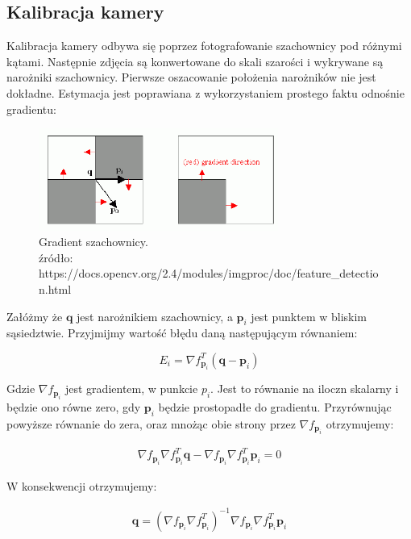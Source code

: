 \documentclass[oneside, eng]{mgr}
\newcommand{\bb}{\textbf}
\begin{document}
\subsection{Kalibracja kamery}

Kalibracja kamery odbywa się poprzez fotografowanie szachownicy pod różnymi kątami. Następnie zdjęcia są konwertowane do skali szarości i wykrywane są narożniki szachownicy. Pierwsze oszacowanie położenia narożników nie jest dokładne. Estymacja jest poprawiana z wykorzystaniem prostego faktu odnośnie gradientu:

\begin{figure}
\centering
	\includegraphics[width=0.70\textwidth]{cornersubpix.png}\par\vspace{1cm}
\caption{Gradient szachownicy. \\ źródło: https://docs.opencv.org/2.4/modules/imgproc/doc/feature\_detection.html}
	\label{fig:gradient}
\end{figure}

Załóżmy że $\bb{q}$ jest narożnikiem szachownicy, a $\bb{p}_i$ jest punktem w bliskim sąsiedztwie. Przyjmijmy wartość błędu daną następującym równaniem:

\begin{equation}
	E_i = \nabla f_{\bb{p}_i}^T (\bb{q} - \bb{p}_i)
\end{equation}

Gdzie $\nabla f_{\bb{p}_i}$ jest gradientem, w punkcie $p_i$. Jest to równanie na iloczn skalarny i będzie ono równe zero, gdy $\bb{p}_i$ będzie prostopadłe do gradientu. Przyrównując powyższe równanie do zera, oraz mnożąc obie strony przez $\nabla f_{\bb{p}_i}$ otrzymujemy:

\begin{align*}
	\nabla f_{\bb{p}_i} \nabla f_{\bb{p}_i}^T \bb{q} - \nabla f_{\bb{p}_i} \nabla f_{\bb{p}_i}^T \bb{p}_i = 0
\end{align*}

W konsekwencji otrzymujemy:

\begin{align}
	\bb{q} = (\nabla f_{\bb{p}_i} \nabla f_{\bb{p}_i}^T)^{-1} \nabla f_{\bb{p}_i} \nabla f_{\bb{p}_i}^T \bb{p}_i
\end{align}
\end{document}

